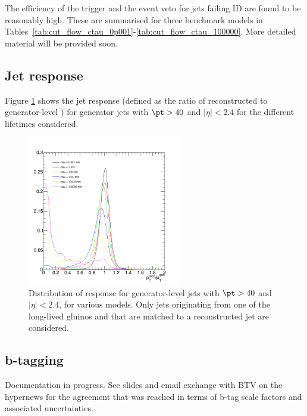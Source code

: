 The efficiency of the trigger and the event veto for jets failing ID are found
to be reasonably high. These are summarised for three benchmark models in 
Tables~\ref{tab:cut_flow_ctau_0p001}-\ref{tab:cut_flow_ctau_100000}. More detailed material will be provided soon.

\subsection{Jet response}
\label{app:LLP-jetresponse}

Figure \ref{fig:T1qqqq:response} shows the jet response (defined as the ratio
of reconstructed \pt to generator-level \pt) for generator jets with $\pt>40$ and 
$|\eta|<2.4$ for the different lifetimes considered.

\begin{figure}
    \begin{center}
    \includegraphics[width=0.6\textwidth]{figures/LLPResults/T1qqqqLL_response}
    \caption{Distribution of response for generator-level jets with $\pt>40$ and $|\eta|<2.4$,
        for various \ctau models. Only jets originating from one of the long-lived gluinos
        and that are matched to a reconstructed jet are considered.}
    \label{fig:T1qqqq:response}
    \end{center}
\end{figure}

\subsection{b-tagging}
\label{app:LLP-btagging}

Documentation in progress. See slides and email exchange with BTV on the
hypernews for the agreement that was reached in terms of b-tag scale factors 
and associated uncertainties.

